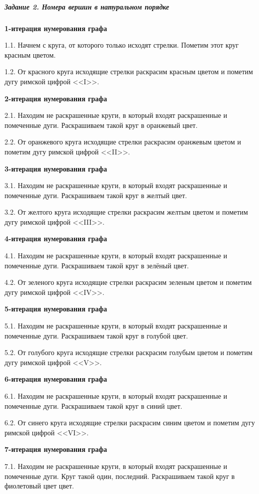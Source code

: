 \subparagraph{Задание 2. Номера вершин в натуральном порядке} \hspace{0pt}

\textbf{1-итерация нумерования графа}

1.1. Начнем с круга, от которого только исходят стрелки. Пометим этот круг красным цветом.

1.2. От красного круга исходящие стрелки раскрасим красным цветом и пометим дугу римской цифрой <<I>>.

\textbf{2-итерация нумерования графа}

2.1. Находим не раскрашенные круги, в который входят раскрашенные и помеченные дуги. Раскрашиваем такой круг в оранжевый цвет.

2.2. От оранжевого круга исходящие стрелки раскрасим оранжевым цветом и пометим дугу римской цифрой <<II>>.

\textbf{3-итерация нумерования графа}

3.1. Находим не раскрашенные круги, в который входят раскрашенные и помеченные дуги. Раскрашиваем такой круг в желтый цвет.

3.2. От желтого круга исходящие стрелки раскрасим желтым цветом и пометим дугу римской цифрой <<III>>.

\textbf{4-итерация нумерования графа}

4.1. Находим не раскрашенные круги, в который входят раскрашенные и помеченные дуги. Раскрашиваем такой круг в зелёный цвет.

4.2. От зеленого круга исходящие стрелки раскрасим зеленым цветом и пометим дугу римской цифрой <<IV>>.

\textbf{5-итерация нумерования графа}

5.1. Находим не раскрашенные круги, в который входят раскрашенные и помеченные дуги. Раскрашиваем такой круг в голубой цвет.

5.2. От голубого круга исходящие стрелки раскрасим голубым цветом и пометим дугу римской цифрой <<V>>.

\textbf{6-итерация нумерования графа}

6.1. Находим не раскрашенные круги, в который входят раскрашенные и помеченные дуги. Раскрашиваем такой круг в синий цвет.

6.2. От синего круга исходящие стрелки раскрасим синим цветом и пометим дугу римской цифрой <<VI>>.

\textbf{7-итерация нумерования графа}

7.1. Находим не раскрашенные круги, в который входят раскрашенные и помеченные дуги. Круг такой один, последний. Раскрашиваем такой круг в фиолетовый цвет цвет.

